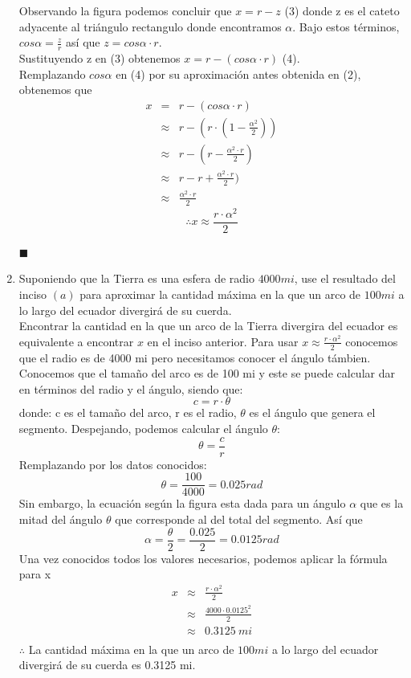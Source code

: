 \documentclass[12pt]{article}
\begin{document}
\begin{enumerate}[label=(\alph*)]
Observando la figura podemos concluir que $x = r - z$ (3) donde z es el cateto adyacente al triángulo rectangulo donde encontramos $\alpha$.
Bajo estos términos, $cos\alpha = \frac{z}{r} $ así que $z = cos \alpha \cdot r$.\\
Sustituyendo z  en (3) obtenemos $x = r -(cos \alpha \cdot r) $ (4).\\
Remplazando $cos\alpha$  en (4) por su aproximación antes obtenida en (2), obtenemos que 
\begin{eqnarray}
x
& = &  r -(cos \alpha \cdot r) \nonumber
\\
& \approx & r -(r \cdot (1 - \frac{\alpha^2}{2})) \nonumber
\\
& \approx  & r -(r - \frac{\alpha^2 \cdot r}{2}) \nonumber
\\
& \approx & r -r + \frac{\alpha^2 \cdot r}{2}) \nonumber
\\
& \approx & \frac{\alpha^2 \cdot r}{2} \nonumber
\end{eqnarray}
\[
\therefore x \approx \frac{r \cdot \alpha^2 }{2}
\]
\begin{flushright}
$\blacksquare$
\end{flushright}
\item Suponiendo que la Tierra es una esfera de radio $4000 mi$, use el resultado del inciso $(a)$ para aproximar la cantidad máxima en la que un arco de $100 mi$ a lo largo del ecuador divergirá de su cuerda.\\
Encontrar la cantidad en la que un arco de la Tierra divergira del ecuador es equivalente a encontrar $x$ en el inciso anterior.
Para usar $x \approx \frac{r \cdot \alpha^2 }{2}$ conocemos que el radio es de 4000 mi pero necesitamos conocer el ángulo támbien. \\
Conocemos que el tamaño del arco es de 100 mi y este se puede calcular dar en términos del radio y el ángulo, siendo que:
\[
c = r \cdot \theta
\]
donde:
c es el tamaño del arco,
r es el radio,
$\theta$ es el ángulo que genera el segmento.
Despejando, podemos calcular el ángulo $\theta$:
\[
\theta = \frac{c}{r}
\]
Remplazando por los datos conocidos:
\[
\theta = \frac{100}{4000} = 0.025 rad
\]
Sin embargo, la ecuación según la figura esta dada para un ángulo $\alpha$ que es la mitad del ángulo $\theta$ que corresponde al del total del segmento.	Así que
\[
\alpha = \frac{\theta}{2} = \frac{0.025}{2}= 0.0125 rad
\]
Una vez conocidos todos los valores necesarios, podemos aplicar la fórmula para x
\begin{eqnarray}
x
& \approx &  \frac{r \cdot \alpha^2 }{2} \nonumber
\\
& \approx & \frac{4000 \cdot 0.0125^2 }{2} \nonumber
\\
& \approx  & 0.3125 ~ mi\nonumber
\\
\end{eqnarray}
$\therefore$  La cantidad máxima en la que un arco de $100 mi$ a lo largo del ecuador divergirá de su cuerda es 0.3125 mi.

\end{enumerate}
\end{document}

